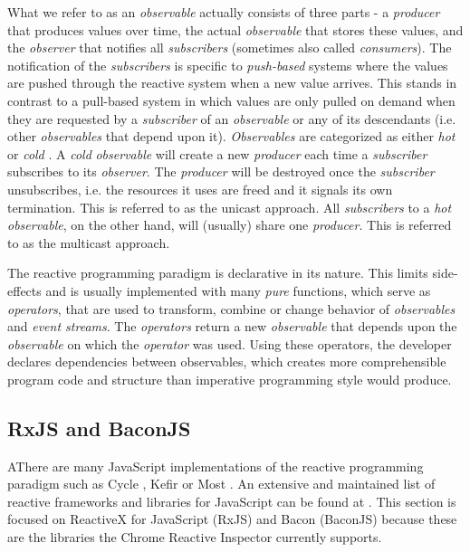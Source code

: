 	What we refer to as an \emph{observable} actually consists of three parts - a \emph{producer} that produces values over time, the actual \emph{observable} that stores these values, and the \emph{observer} that notifies all \emph{subscribers} (sometimes also called \emph{consumers}). The notification of the \emph{subscribers} is specific to \emph{push-based} systems where the values are pushed through the reactive system when a new value arrives. This stands in contrast to a pull-based system in which values are only pulled on demand when they are requested by a \emph{subscriber} of an \emph{observable} or any of its descendants (i.e. other \emph{observables} that depend upon it).
	\emph{Observables} are categorized as either \emph{hot} or \emph{cold} \cite{HotVsCold}. A \emph{cold} \emph{observable} will create a new \emph{producer} each time a \emph{subscriber} subscribes to its \emph{observer}. The \emph{producer} will be destroyed once the \emph{subscriber} unsubscribes, i.e. the resources it uses are freed and it signals its own termination. This is referred to as the unicast approach. All \emph{subscribers} to a \emph{hot} \emph{observable}, on the other hand, will (usually) share one \emph{producer}. This is referred to as the multicast approach.
	
	The reactive programming paradigm is declarative in its nature. This limits side-effects and is usually implemented with many \emph{pure} functions, which serve as \emph{operators}, that are used to transform, combine or change behavior of \emph{observables} and \emph{event streams}. The \emph{operators} return a new \emph{observable} that depends upon the \emph{observable} on which the \emph{operator} was used. Using these operators, the developer declares dependencies between observables, which creates more comprehensible program code and structure \cite[Why Reactive Programming?]{ReactiveInspector} than imperative programming style would produce.

	\subsection{RxJS and BaconJS}
	AThere are many JavaScript implementations of the reactive programming paradigm such as Cycle \cite{CycleJS}, Kefir \cite{KefirJS} or Most \cite{MostJS}. An extensive and maintained list of reactive frameworks and libraries for JavaScript can be found at \cite{FRPJSList}. This section is focused on ReactiveX for JavaScript (RxJS) \cite{RxJS} and Bacon (BaconJS) \cite{BaconJS} because these are the libraries the Chrome Reactive Inspector currently supports.
	
